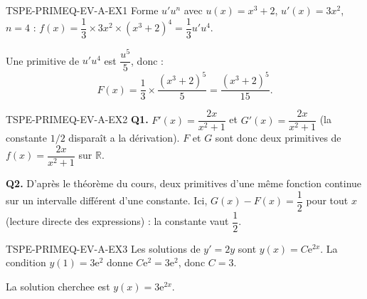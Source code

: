 \begin{corrige}{TSPE-PRIMEQ-EV-A-EX1}
Forme $u'u^n$ avec $u(x)=x^3+2$, $u'(x)=3x^2$, $n=4$ : $f(x) = \dfrac{1}{3} \times 3x^2 \times (x^3+2)^4 = \dfrac{1}{3}u'u^4$.

Une primitive de $u'u^4$ est $\dfrac{u^5}{5}$, donc :
\[
  \boxed{F(x) = \frac{1}{3} \times \frac{(x^3+2)^5}{5} = \frac{(x^3+2)^5}{15}}.
\]
\end{corrige}

\begin{corrige}{TSPE-PRIMEQ-EV-A-EX2}
\textbf{Q1.} $F'(x) = \dfrac{2x}{x^2+1}$ et $G'(x) = \dfrac{2x}{x^2+1}$ (la constante $1/2$ disparaît a la dérivation). $F$ et $G$ sont donc deux primitives de $f(x) = \dfrac{2x}{x^2+1}$ sur $\mathbb{R}$.

\textbf{Q2.} D'après le théorème du cours, deux primitives d'une même fonction continue sur un intervalle différent d'une constante. Ici, $G(x)-F(x) = \dfrac{1}{2}$ pour tout $x$ (lecture directe des expressions) : la constante vaut $\dfrac{1}{2}$.
\end{corrige}

\begin{corrige}{TSPE-PRIMEQ-EV-A-EX3}
Les solutions de $y'=2y$ sont $y(x) = C\mathrm{e}^{2x}$. La condition $y(1)=3\mathrm{e}^2$ donne $C\mathrm{e}^2 = 3\mathrm{e}^2$, donc $C=3$.

La solution cherchee est $y(x) = 3\mathrm{e}^{2x}$.
\end{corrige}
